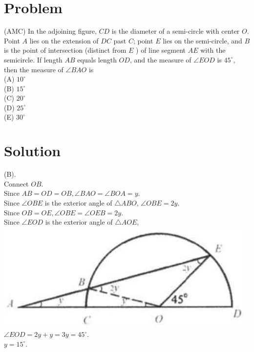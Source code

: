 \documentclass{article}
\begin{document}
\section*{Problem}
(AMC) In the adjoining figure, \(C D\) is the diameter of a semi-circle with center \(O\). Point \(A\) lies on the extension of \(D C\) past \(C\); point \(E\) lies on the semi-circle, and \(B\) is the point of intersection (distinct from \(E\) ) of line segment \(A E\) with the semicircle. If length \(A B\) equals length \(O D\), and the measure of \(\angle E O D\) is \(45^{\circ}\), then the measure of \(\angle B A O\) is\\
(A) \(10^{\circ}\)\\
(B) \(15^{\circ}\)\\
(C) \(20^{\circ}\)\\
(D) \(25^{\circ}\)\\
(E) \(30^{\circ}\)

\section*{Solution}
(B).\\
Connect \(O B\).\\
Since \(A B=O D=O B, \angle B A O=\angle B O A=y\).\\
Since \(\angle O B E\) is the exterior angle of \(\triangle A B O\), \(\angle O B E=2 y\).\\
Since \(O B=O E, \angle O B E=\angle O E B=2 y\).\\
Since \(\angle E O D\) is the exterior angle of \(\triangle A O E\),\\
\centering
\includegraphics[width=\textwidth]{images/159(2).jpg}\\
\(\angle E O D=2 y+y=3 y=45^{\circ}\).\\
\(y=15^{\circ}\).\\
\end{document}
